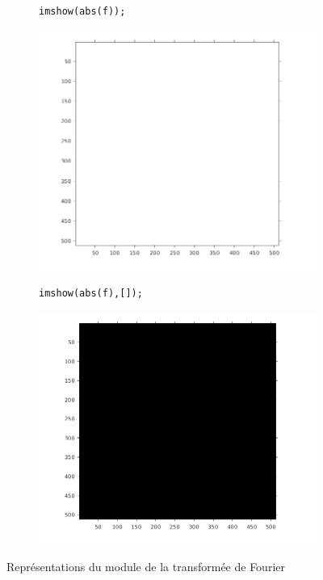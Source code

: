 \documentclass[12pt,a4paper,onecolumn]{article}
\begin{document}
\begin{figure}[H]
	\centering
	\begin{subfigure}[b]{\textwidth}
		\centering
		\begin{lstlisting}[frame = none, numbers = none]
		imshow(abs(f));
		\end{lstlisting}
		\includegraphics[scale = 1, height = 0.3\textheight]{7_21}
		\label{7_21}
	\end{subfigure}
	\vspace{2cm}
	\begin{subfigure}[b]{\textwidth}
		\centering
		\begin{lstlisting}[frame=none, numbers = none]
		imshow(abs(f),[]);
		\end{lstlisting}
		\includegraphics[scale = 1, height = 0.3\textheight]{7_22}
		\label{7_22}
	\end{subfigure}
	\caption{Représentations du module de la transformée de Fourier}
	\label{7_2}
\end{figure}
\end{document}
